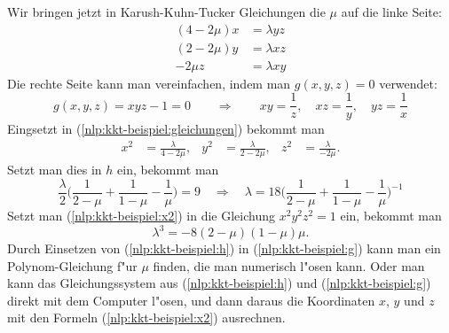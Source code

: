 \begin{beispiel}
Wir bringen jetzt in Karush-Kuhn-Tucker Gleichungen die $\mu$ auf die
linke Seite:
\begin{equation}
\begin{aligned}
(4-2\mu)x&=\lambda yz\\
(2-2\mu)y&=\lambda xz\\
-2\mu z&=\lambda xy
\end{aligned}
\label{nlp:kkt-beispiel:gleichungen}
\end{equation}
Die rechte Seite kann man vereinfachen, indem man $g(x,y,z)=0$ verwendet:
\[
g(x,y,z)=xyz-1=0\qquad\Rightarrow\qquad
xy=\frac1z,\quad
xz=\frac1y,\quad
yz=\frac1x
\]
Eingsetzt  in (\ref{nlp:kkt-beispiel:gleichungen}) bekommt man
\begin{equation}
\begin{aligned}
x^2&=\frac{\lambda}{4-2\mu},&
y^2&=\frac{\lambda}{2-2\mu},&
z^2&=\frac{\lambda}{-2\mu}.
\end{aligned}
\label{nlp:kkt-beispiel:x2}
\end{equation}
Setzt man dies in $h$ ein, bekommt man
\begin{equation}
\frac{\lambda}2
\biggl(
\frac1{2-\mu}+\frac1{1-\mu}-\frac1{\mu}
\biggr) =9
\quad\Rightarrow\quad
\lambda=18\biggl(
\frac1{2-\mu}+\frac1{1-\mu}-\frac1{\mu}
\biggr)^{-1}
\label{nlp:kkt-beispiel:h}
\end{equation}
Setzt man (\ref{nlp:kkt-beispiel:x2}) in die Gleichung $x^2y^2z^2=1$ ein,
bekommt man
\begin{equation}
\lambda^3=-8(2-\mu)(1-\mu)\mu.
\label{nlp:kkt-beispiel:g}
\end{equation}
Durch Einsetzen von (\ref{nlp:kkt-beispiel:h}) in (\ref{nlp:kkt-beispiel:g})
kann man ein Polynom-Gleichung f"ur $\mu$ finden, die man numerisch
l"osen kann. Oder man kann das Gleichungssystem aus
(\ref{nlp:kkt-beispiel:h}) und (\ref{nlp:kkt-beispiel:g}) direkt
mit dem Computer l"osen, und dann daraus die Koordinaten $x$, $y$ und
$z$ mit den Formeln (\ref{nlp:kkt-beispiel:x2}) ausrechnen.
\end{beispiel}

